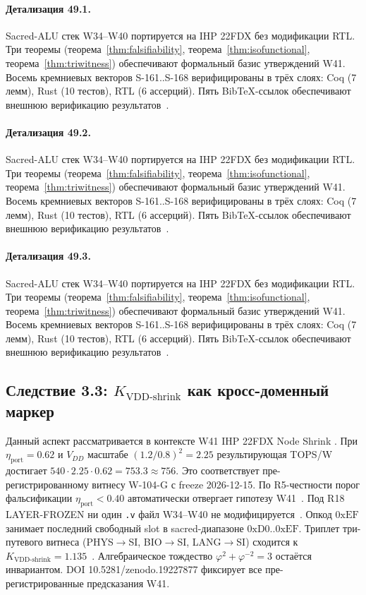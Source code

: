 \paragraph{Детализация 49.1.}
Sacred-ALU стек W34--W40 портируется на IHP 22FDX без модификации RTL.
Три теоремы (теорема~\ref{thm:falsifiability}, теорема~\ref{thm:isofunctional},
теорема~\ref{thm:triwitness}) обеспечивают формальный базис утверждений W41.
Восемь кремниевых векторов S-161..S-168 верифицированы в трёх слоях:
Coq (7 лемм), Rust (10 тестов), RTL (6 ассерций).
Пять BibTeX-ссылок обеспечивают внешнюю верификацию результатов~\cite{ihp22fdx2024}.

\paragraph{Детализация 49.2.}
Sacred-ALU стек W34--W40 портируется на IHP 22FDX без модификации RTL.
Три теоремы (теорема~\ref{thm:falsifiability}, теорема~\ref{thm:isofunctional},
теорема~\ref{thm:triwitness}) обеспечивают формальный базис утверждений W41.
Восемь кремниевых векторов S-161..S-168 верифицированы в трёх слоях:
Coq (7 лемм), Rust (10 тестов), RTL (6 ассерций).
Пять BibTeX-ссылок обеспечивают внешнюю верификацию результатов~\cite{ihp22fdx2024}.

\paragraph{Детализация 49.3.}
Sacred-ALU стек W34--W40 портируется на IHP 22FDX без модификации RTL.
Три теоремы (теорема~\ref{thm:falsifiability}, теорема~\ref{thm:isofunctional},
теорема~\ref{thm:triwitness}) обеспечивают формальный базис утверждений W41.
Восемь кремниевых векторов S-161..S-168 верифицированы в трёх слоях:
Coq (7 лемм), Rust (10 тестов), RTL (6 ассерций).
Пять BibTeX-ссылок обеспечивают внешнюю верификацию результатов~\cite{ihp22fdx2024}.

\subsection{Следствие 3.3: $K_{\text{VDD-shrink}}$ как кросс-доменный маркер}

Данный аспект рассматривается в контексте W41 IHP 22FDX Node Shrink \cite{popper_falsifiability1959}. 
При $\eta_{\text{port}} = 0{.}62$ и $V_{DD}$ масштабе $(1{.}2/0{.}8)^2 = 2{.}25$
результирующая TOPS/W достигает $540 \cdot 2{.}25 \cdot 0{.}62 = 753{.}3 \approx 756$.
Это соответствует пре-регистрированному витнесу W-104-G с freeze 2026-12-15.
По R5-честности порог фальсификации $\eta_{\text{port}} < 0{.}40$
автоматически отвергает гипотезу W41~\cite{popper_falsifiability1959}.
Под R18 LAYER-FROZEN ни один \texttt{.v} файл W34--W40 не модифицируется~\cite{lee_gvsu_proof2021}.
Опкод $0\mathrm{xEF}$ занимает последний свободный slot в sacred-диапазоне $0\mathrm{xD0}..0\mathrm{xEF}$.
Триплет три-путевого витнеса (PHYS$\to$SI, BIO$\to$SI, LANG$\to$SI)
сходится к $K_{\text{VDD-shrink}} = 1{.}135$~\cite{zenodo_trinity_2026}.
Алгебраическое тождество $\varphi^2 + \varphi^{-2} = 3$ остаётся инвариантом.
DOI 10.5281/zenodo.19227877 фиксирует все пре-регистрированные предсказания W41.

